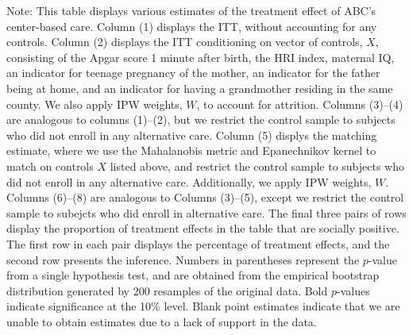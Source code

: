 \begin{table}[H]
\begin{threeparttable}
\begin{tabular}{cccccccccc}
  \hline\hline
  \end{tabular}
    \begin{tablenotes}
    \scriptsize
    \item 
Note: This table displays various estimates of the treatment effect of ABC's center-based care.
Column (1) displays the ITT, without accounting for any controls.
Column (2) displays the ITT conditioning on vector of controls, $X$, consisting of the Apgar score 1 minute after birth, the HRI index, maternal IQ, an
indicator for teenage pregnancy of the mother, an indicator for the father being at 
home, and an indicator for having a grandmother residing in the same county. We also apply IPW weights, $W$, to account for attrition.
Columns (3)--(4) are analogous to columns (1)--(2), but we restrict the control sample to subjects
who did not enroll in any alternative care.
Column (5) displys the matching estimate, where we use the Mahalanobis metric and Epanechnikov kernel
to match on controls $X$ listed above, and restrict the control sample to subjects who did not enroll
in any alternative care. Additionally, we apply IPW weights, $W$.
Columns (6)--(8) are analogous to Columns (3)--(5), except we restrict the control sample to subejcts
who did enroll in alternative care. The final three pairs of rows display the proportion of treatment effects in the table that are 
socially positive. The first row in each pair displays the percentage of treatment effects, and the
second row presents the inference. 
Numbers in parentheses represent the $p$-value from a single hypothesis test, and are obtained from 
the empirical bootstrap distribution generated by 200 resamples of the original data. 
Bold $p$-values indicate significance at the 10\% level.
Blank point estimates indicate that we are unable to obtain estimates due to a lack of support in the data. 

    \end{tablenotes}
  \end{threeparttable}

\end{table}